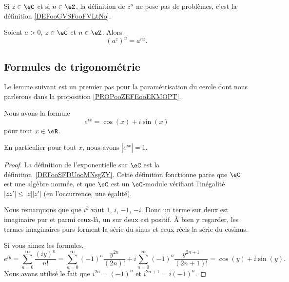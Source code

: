 Si \( z\in \eC\) et si \( n\in \eZ\), la définition de \( z^n\) ne pose pas de problèmes, c'est la définition \ref{DEFooGVSFooFVLtNo}.

\begin{lemma}        \label{LEMooTDGKooWdpUTD}
    Soient \( a>0\), \( z\in \eC\) et \( n\in \eZ\). Alors
    \begin{equation}
        (a^z)^n=a^{nz}.
    \end{equation}
\end{lemma}

\subsection{Formules de trigonométrie}

Le lemme suivant est un premier pas pour la paramétrisation du cercle dont nous parlerons dans la proposition \ref{PROPooZEFEooEKMOPT}.
\begin{lemma}       \label{LEMooHOYZooKQTsXW}
    Nous avons la formule
    \begin{equation}        \label{EQooRVPJooTMwNTU}
        e^{ix}=\cos(x)+i\sin(x)
    \end{equation}
    pour tout \( x\in \eR\).

    En particulier pour tout \( x\), nous avons \( |  e^{ix} |=1\).
\end{lemma}

\begin{proof}
    La définition de l'exponentielle sur \( \eC\) est la définition~\ref{DEFooSFDUooMNsgZY}. Cette définition fonctionne parce que \( \eC\) est une algèbre normée, et que \( \eC\) est un \( \eC\)-module vérifiant l'inégalité \(  | zz' |\leq | z | |z' | \) (en l'occurrence, une égalité).

    Nous remarquons que que \( i^k\) vaut \( 1\), \( i\), \( -1\), \( -i\). Donc un terme sur deux est imaginaire pur et parmi ceux-là, un sur deux est positif. À bien y regarder, les termes imaginaires purs forment la série du sinus et ceux réels la série du cosinus.

    Si vous aimez les formules,
    \begin{equation}
            e^{iy}=\sum_{n=0}^{\infty}\frac{ (iy)^n }{ n! }
            =\sum_{n=0}^{\infty}(-1)^n\frac{ y^{2n} }{ (2n)! }+i\sum_{n=0}^{\infty}(-1)^n\frac{ y^{2n+1} }{ (2n+1)! }
            =\cos(y)+i\sin(y).
    \end{equation}
    Nous avons utilisé le fait que \( i^{2n}=(-1)^n\) et \( i^{2n+1}=i(-1)^n\).
\end{proof}

